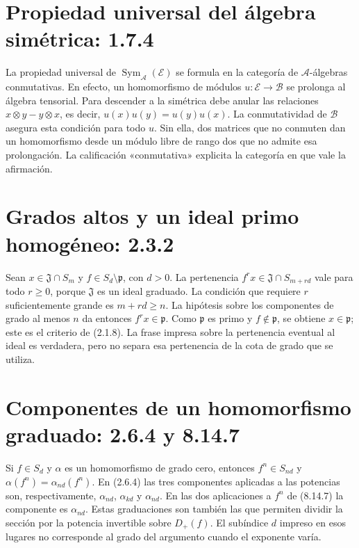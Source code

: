 \documentclass[11pt,a4paper]{article}
\begin{document}
\section{Propiedad universal del álgebra simétrica: 1.7.4}
La propiedad universal de $\operatorname{Sym}_{\mathcal A}(\mathcal E)$
se formula en la categoría de $\mathcal A$-álgebras conmutativas.
En efecto, un homomorfismo de módulos $u:\mathcal E\to\mathcal B$
se prolonga al álgebra tensorial. Para descender a la simétrica debe
anular las relaciones $x\otimes y-y\otimes x$, es decir,
$u(x)u(y)=u(y)u(x)$. La conmutatividad de $\mathcal B$ asegura esta
condición para todo $u$. Sin ella, dos matrices que no conmuten dan
un homomorfismo desde un módulo libre de rango dos que no admite
esa prolongación. La calificación «conmutativa» explicita la categoría
en que vale la afirmación.

\section{Grados altos y un ideal primo homogéneo: 2.3.2}
Sean $x\in\mathfrak J\cap S_m$ y $f\in S_d\setminus\mathfrak p$,
con $d>0$. La pertenencia $f^rx\in\mathfrak J\cap S_{m+rd}$ vale
para todo $r\geq0$, porque $\mathfrak J$ es un ideal graduado.
La condición que requiere $r$ suficientemente grande es $m+rd\geq n$.
La hipótesis sobre los componentes de grado al menos $n$ da entonces
$f^rx\in\mathfrak p$. Como $\mathfrak p$ es primo y $f\notin\mathfrak p$,
se obtiene $x\in\mathfrak p$; este es el criterio de (2.1.8).
La frase impresa sobre la pertenencia eventual al ideal es verdadera,
pero no separa esa pertenencia de la cota de grado que se utiliza.

\section{Componentes de un homomorfismo graduado: 2.6.4 y 8.14.7}
Si $f\in S_d$ y $\alpha$ es un homomorfismo de grado cero, entonces
$f^n\in S_{nd}$ y $\alpha(f^n)=\alpha_{nd}(f^n)$.
En (2.6.4) las tres componentes aplicadas a las potencias son,
respectivamente, $\alpha_{nd}$, $\alpha_{kd}$ y $\alpha_{nd}$.
En las dos aplicaciones a $f^n$ de (8.14.7) la componente es
$\alpha_{nd}$. Estas graduaciones son también las que permiten
dividir la sección por la potencia invertible sobre $D_+(f)$.
El subíndice $d$ impreso en esos lugares no corresponde al grado
del argumento cuando el exponente varía.
\end{document}
